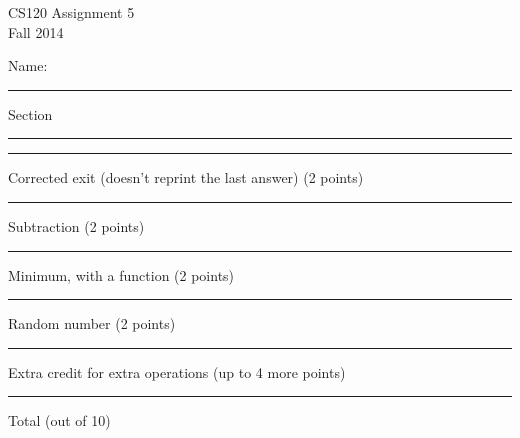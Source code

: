 \documentclass[12pt,openbib]{article}
\begin{document}
\thispagestyle{empty}
\vspace{-1.0in}
\large
\begin{center}
\textsf{CS120  Assignment 5}\\
\textsf{Fall 2014}
\end{center}
\vspace{-0.2in}
\large\textsf{Name: }\rule[-0.01in]{2.5in}{0.015in}
\hspace{0.5in} Section \rule[-0.01in]{1.0in}{0.015in}

\normalsize
\rm
\vspace{0.5in}
\rule[-0.01in]{0.5in}{0.015in} Corrected exit (doesn't reprint the last answer) (2 points)
 
\rule[-0.01in]{0.5in}{0.015in} Subtraction (2 points)

\rule[-0.01in]{0.5in}{0.015in} Minimum, with a function (2 points)

\rule[-0.01in]{0.5in}{0.015in} Random number (2 points)

\rule[-0.01in]{0.5in}{0.015in} Extra credit for extra operations (up to 4 more points)

\rule[-0.01in]{0.5in}{0.015in} Total (out of 10)
\end{document}
